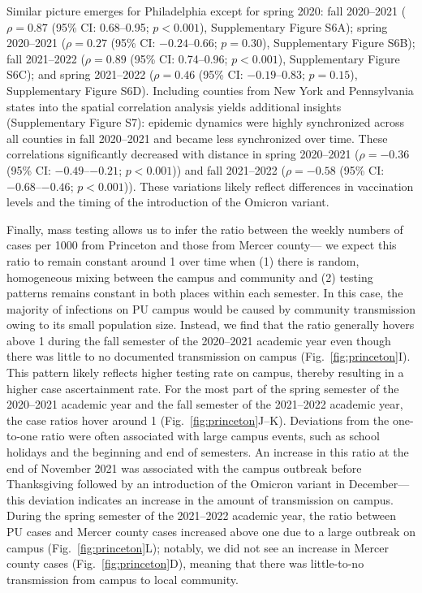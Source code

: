 \documentclass[12pt]{article}
\newcommand{\fref}[1]{Fig.~\ref{fig:#1}}
\begin{document}
Similar picture emerges for Philadelphia except for spring 2020: fall 2020--2021 ($\rho = 0.87$ (95\% CI: 0.68--0.95; $p < 0.001$), Supplementary Figure S6A); spring 2020--2021 ($\rho = 0.27$ (95\% CI: $-0.24$--0.66; $p = 0.30$), Supplementary Figure S6B); fall 2021--2022 ($\rho = 0.89$ (95\% CI: 0.74--0.96; $p < 0.001$), Supplementary Figure S6C); 
and spring 2021--2022 ($\rho=0.46$ (95\% CI: $-0.19$--0.83; $p=0.15$), Supplementary Figure S6D).
Including counties from New York and Pennsylvania states into the spatial correlation analysis yields additional insights (Supplementary Figure S7):
epidemic dynamics were highly synchronized across all counties in fall 2020--2021 and became less synchronized over time. 
These correlations significantly decreased with distance in spring 2020--2021 ($\rho = -0.36$ (95\% CI: $-0.49$--$-0.21$; $p < 0.001$)) and fall 2021--2022 ($\rho = -0.58$ (95\% CI: $-0.68$--$-0.46$; $p < 0.001$)).
These variations likely reflect differences in vaccination levels and the timing of the introduction of the Omicron variant.

Finally, mass testing allows us to infer the ratio between the weekly numbers of cases per 1000 from Princeton and those from Mercer county---
we expect this ratio to remain constant around 1 over time when (1) there is random, homogeneous mixing between the campus and community and (2) testing patterns remains constant in both places within each semester. 
In this case, the majority of infections on PU campus would be caused by community transmission owing to its small population size.
Instead, we find that the ratio generally hovers above 1 during the fall semester of the 2020--2021 academic year even though there was little to no documented transmission on campus (\fref{princeton}I).
This pattern likely reflects higher testing rate on campus, thereby resulting in a higher case ascertainment rate.
For the most part of the spring semester of the 2020--2021 academic year and the fall semester of the 2021--2022 academic year, the case ratios hover around 1 (\fref{princeton}J--K).
Deviations from the one-to-one ratio were often associated with large campus events, such as school holidays and the beginning and end of semesters.
An increase in this ratio at the end of November 2021 was associated with the campus outbreak before Thanksgiving followed by an introduction of the Omicron variant in December---this deviation indicates an increase in the amount of transmission on campus.
During the spring semester of the 2021--2022 academic year, the ratio between PU cases and Mercer county cases increased above one due to a large outbreak on campus (\fref{princeton}L);
notably, we did not see an increase in Mercer county cases (\fref{princeton}D), meaning that there was little-to-no transmission from campus to local community.
\end{document}
